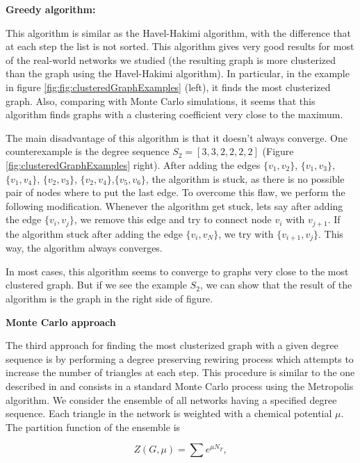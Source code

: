 \documentclass{article}
\begin{document}
{\bf Greedy algorithm:}

This algorithm is similar as the Havel-Hakimi algorithm, with the difference that at each step the list is not sorted. This algorithm gives very good results for most of the real-world networks we studied (the resulting graph is more clusterized than the graph using the Havel-Hakimi algorithm). In particular, in the example in figure \ref{fig:fig:clusteredGraphExamples} (left), it finds the most clusterized graph. Also, comparing with Monte Carlo simulations, it seems that this algorithm finds graphs with a clustering coefficient very close to the maximum. 

The main disadvantage of this algorithm is that it doesn't always converge. One counterexample is the degree sequence $S_2 = [3, 3, 2, 2, 2, 2]$ (Figure \ref{fig:clusteredGraphExamples} right). After adding the edges $\lbrace v_1, v_2 \rbrace$, $\lbrace v_1, v_3 \rbrace$, $\lbrace v_1, v_4 \rbrace$, $\lbrace v_2, v_3 \rbrace$, $\lbrace v_2, v_4 \rbrace$,$ \lbrace v_5, v_6 \rbrace$, the algorithm is stuck, as there is no possible pair of nodes where to put the last edge. To overcome this flaw, we  perform the following modification. Whenever the algorithm get stuck, lets say after adding the edge $\lbrace v_i, v_j \rbrace$, we remove this edge and try to connect node $v_i$ with $v_{j+1}$. If the algorithm stuck after adding the edge $\lbrace v_i, v_N \rbrace$, we try with $\lbrace v_{i+1}, v_j \rbrace$. This way, the algorithm always converges. 

In most cases, this algorithm seems to converge to graphs very close to the most clustered graph. But if we see the example $S_2$, we can show that the result of the algorithm is the graph in the right side of figure.

{\bf Monte Carlo approach}

The third approach for finding the most clusterized graph with a given degree sequence is by performing a degree preserving rewiring process which attempts to increase the number of triangles at each step. This procedure is similar to the one described in \cite{Tamm2014IslandsNetworks} and consists in a standard Monte Carlo process using the Metropolis algorithm. We consider the ensemble of all networks having a specified degree sequence. Each triangle in the network is weighted with a chemical potential $\mu$. The partition function of the ensemble is 

\begin{equation}
Z(G, \mu) = \sum e^{\mu N_T},
\end{equation}
\end{document}
